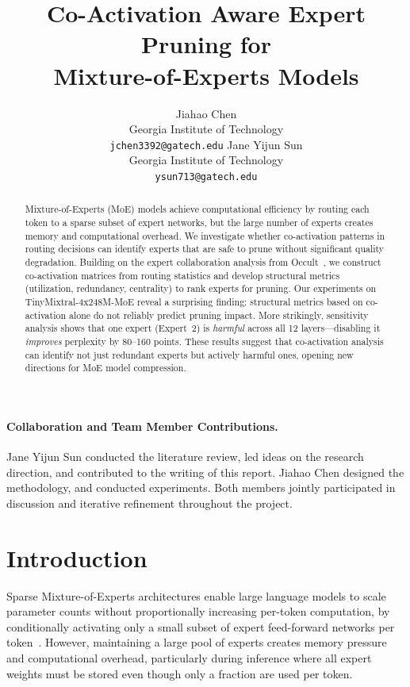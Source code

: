 \documentclass{article}
\title{Co-Activation Aware Expert Pruning for\\
Mixture-of-Experts Models}
\author{Jiahao Chen \\
Georgia Institute of Technology \\
\texttt{jchen3392@gatech.edu}
\And
Jane Yijun Sun \\
Georgia Institute of Technology \\
\texttt{ysun713@gatech.edu}
}
\begin{document}
\maketitle

\paragraph{Collaboration and Team Member Contributions.}
Jane Yijun Sun conducted the literature review, led ideas on the
research direction, and contributed to the writing of this report.
Jiahao Chen designed the methodology, and  conducted experiments.
Both members jointly participated in discussion and iterative refinement throughout
the project.

\begin{abstract}
Mixture-of-Experts (MoE) models achieve computational efficiency by routing each token
to a sparse subset of expert networks, but the large number of experts creates
memory and computational overhead.
We investigate whether co-activation patterns in routing decisions can identify
experts that are safe to prune without significant quality degradation.
Building on the expert collaboration analysis from Occult~\citep{luo2025occult},
we construct co-activation matrices from routing statistics and develop structural
metrics (utilization, redundancy, centrality) to rank experts for pruning.
Our experiments on TinyMixtral-4x248M-MoE reveal a surprising finding: structural
metrics based on co-activation alone do not reliably predict pruning impact.
More strikingly, sensitivity analysis shows that one expert (Expert~2) is
\emph{harmful} across all 12 layers---disabling it \emph{improves} perplexity by
80--160 points.
These results suggest that co-activation analysis can identify not just redundant
experts but actively harmful ones, opening new directions for MoE model compression.
\end{abstract}

\section{Introduction}

Sparse Mixture-of-Experts architectures enable large language models to scale parameter
counts without proportionally increasing per-token computation, by conditionally
activating only a small subset of expert feed-forward networks per
token~\citep{shazeer2017outrageously,fedus2022switch}.
However, maintaining a large pool of experts creates memory pressure and computational
overhead, particularly during inference where all expert weights must be stored even
though only a fraction are used per token.
\end{document}
